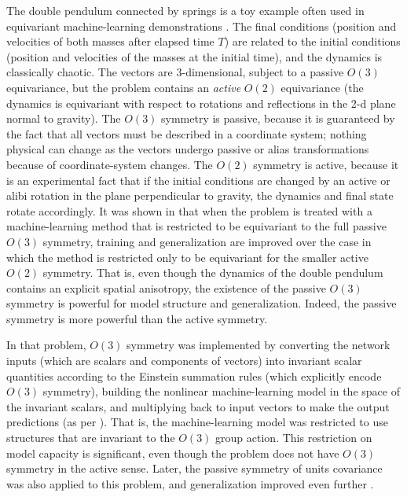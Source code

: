 \documentclass{article}
\theoremstyle{plain}
\theoremstyle{definition}
\theoremstyle{remark}
\begin{document}
The double pendulum connected by springs is a toy example often used in equivariant machine-learning demonstrations \cite{finzi2021practical,yao2021simple}. 
The final conditions (position and velocities of both masses after elapsed time $T$) are related to the initial conditions (position and velocities of the masses at the initial time), and the dynamics is classically chaotic.
The vectors are 3-dimensional, subject to a passive $O(3)$ equivariance, but the problem contains an \emph{active} $O(2)$ equivariance (the dynamics is equivariant with respect to rotations and reflections in the 2-d plane normal to gravity).
The $O(3)$ symmetry is passive, because it is guaranteed by the fact that all vectors must be described in a coordinate system; nothing physical can change as the vectors undergo passive or alias transformations because of coordinate-system changes.
The $O(2)$ symmetry is active, because it is an experimental fact that if the initial conditions are changed by an active or alibi rotation in the plane perpendicular to gravity, the dynamics and final state rotate accordingly.
It was shown in \cite{yao2021simple} that when the problem is treated with a machine-learning method that is restricted to be equivariant to the full passive $O(3)$ symmetry, training and generalization are improved over the case in which the method is restricted only to be equivariant for the smaller active $O(2)$ symmetry.
That is, even though the dynamics of the double pendulum contains an explicit spatial anisotropy, the existence of the passive $O(3)$ symmetry is powerful for model structure and generalization.
Indeed, the passive symmetry is more powerful than the active symmetry.

In that problem, $O(3)$ symmetry was implemented by converting the network inputs (which are scalars and components of vectors) into invariant scalar quantities according to the Einstein summation rules (which explicitly encode $O(3)$ symmetry), building the nonlinear machine-learning model in the space of the invariant scalars, and multiplying back to input vectors to make the output predictions (as per \citealt{villar2021scalars}).
That is, the machine-learning model was restricted to use structures that are invariant to the $O(3)$ group action.
This restriction on model capacity is significant, even though the problem does not have $O(3)$ symmetry in the active sense.
Later, the passive symmetry of units covariance was also applied to this problem, and generalization improved even further \cite{villar2022dimensionless}.
\end{document}
